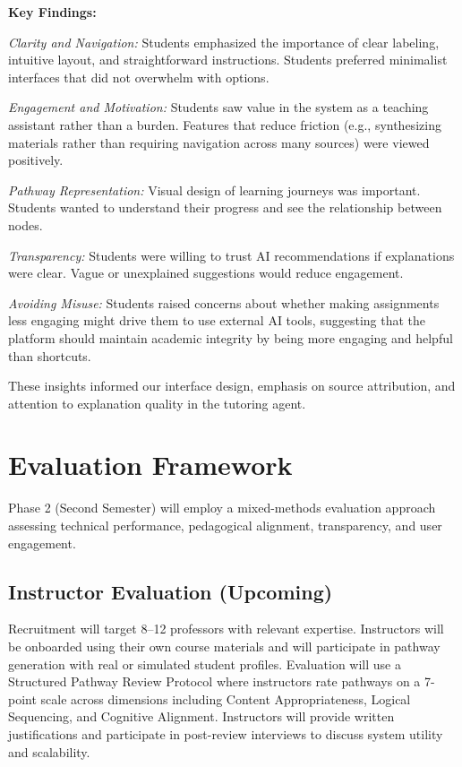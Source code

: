\documentclass{stylefiles/capstone}
\begin{document}
\textbf{Key Findings:}

\textit{Clarity and Navigation:} Students emphasized the importance of clear labeling, intuitive layout, and straightforward instructions. Students preferred minimalist interfaces that did not overwhelm with options.

\textit{Engagement and Motivation:} Students saw value in the system as a teaching assistant rather than a burden. Features that reduce friction (e.g., synthesizing materials rather than requiring navigation across many sources) were viewed positively.

\textit{Pathway Representation:} Visual design of learning journeys was important. Students wanted to understand their progress and see the relationship between nodes.

\textit{Transparency:} Students were willing to trust AI recommendations if explanations were clear. Vague or unexplained suggestions would reduce engagement.

\textit{Avoiding Misuse:} Students raised concerns about whether making assignments less engaging might drive them to use external AI tools, suggesting that the platform should maintain academic integrity by being more engaging and helpful than shortcuts.

These insights informed our interface design, emphasis on source attribution, and attention to explanation quality in the tutoring agent.

\section{Evaluation Framework}

Phase 2 (Second Semester) will employ a mixed-methods evaluation approach assessing technical performance, pedagogical alignment, transparency, and user engagement.

\subsection{Instructor Evaluation (Upcoming)}

Recruitment will target 8--12 professors with relevant expertise. Instructors will be onboarded using their own course materials and will participate in pathway generation with real or simulated student profiles. Evaluation will use a Structured Pathway Review Protocol where instructors rate pathways on a 7-point scale across dimensions including Content Appropriateness, Logical Sequencing, and Cognitive Alignment. Instructors will provide written justifications and participate in post-review interviews to discuss system utility and scalability.
\end{document}
